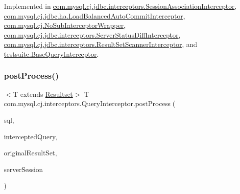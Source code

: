 Implemented in \mbox{\hyperlink{classcom_1_1mysql_1_1cj_1_1jdbc_1_1interceptors_1_1_session_association_interceptor_af6940dabb40c900b336fb6f5761160b6}{com.\+mysql.\+cj.\+jdbc.\+interceptors.\+Session\+Association\+Interceptor}}, \mbox{\hyperlink{classcom_1_1mysql_1_1cj_1_1jdbc_1_1ha_1_1_load_balanced_auto_commit_interceptor_a72ccbcacf034135666a25f6f85b483f0}{com.\+mysql.\+cj.\+jdbc.\+ha.\+Load\+Balanced\+Auto\+Commit\+Interceptor}}, \mbox{\hyperlink{classcom_1_1mysql_1_1cj_1_1_no_sub_interceptor_wrapper_a1d037e783990bcd80c1ce5a16a1cf254}{com.\+mysql.\+cj.\+No\+Sub\+Interceptor\+Wrapper}}, \mbox{\hyperlink{classcom_1_1mysql_1_1cj_1_1jdbc_1_1interceptors_1_1_server_status_diff_interceptor_a918b0b784bd4d6edb689aa1cf01afb66}{com.\+mysql.\+cj.\+jdbc.\+interceptors.\+Server\+Status\+Diff\+Interceptor}}, \mbox{\hyperlink{classcom_1_1mysql_1_1cj_1_1jdbc_1_1interceptors_1_1_result_set_scanner_interceptor_a8b4dccb5d9c1fd75ed0e04fe50a2c087}{com.\+mysql.\+cj.\+jdbc.\+interceptors.\+Result\+Set\+Scanner\+Interceptor}}, and \mbox{\hyperlink{classtestsuite_1_1_base_query_interceptor_a9772ae8ec3555a8f2d3a49658c90b3c7}{testsuite.\+Base\+Query\+Interceptor}}.

\mbox{\label{interfacecom_1_1mysql_1_1cj_1_1interceptors_1_1_query_interceptor_acd2344550559d32789873afcd3d54cc0}} 
\subsubsection{\texorpdfstring{post\+Process()}{postProcess()}\hspace{0.1cm}{\footnotesize\ttfamily [1/2]}}
{\footnotesize\ttfamily $<$T extends \mbox{\hyperlink{interfacecom_1_1mysql_1_1cj_1_1protocol_1_1_resultset}{Resultset}}$>$ T com.\+mysql.\+cj.\+interceptors.\+Query\+Interceptor.\+post\+Process (\begin{DoxyParamCaption}\item[{Supplier$<$ String $>$}]{sql,  }\item[{\mbox{\hyperlink{interfacecom_1_1mysql_1_1cj_1_1_query}{Query}}}]{intercepted\+Query,  }\item[{T}]{original\+Result\+Set,  }\item[{\mbox{\hyperlink{interfacecom_1_1mysql_1_1cj_1_1protocol_1_1_server_session}{Server\+Session}}}]{server\+Session }\end{DoxyParamCaption})}

